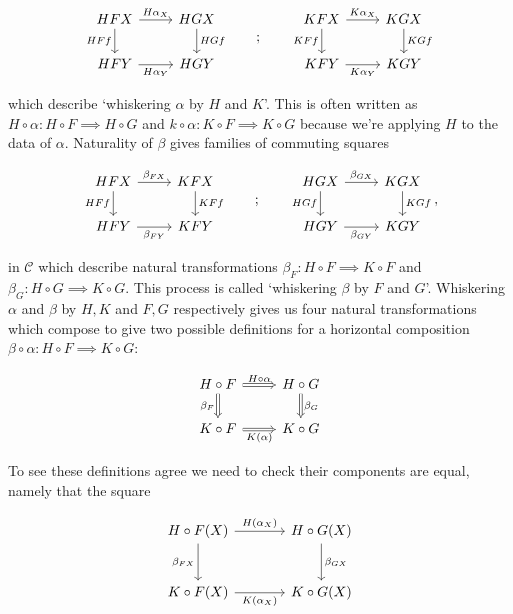 \documentclass[11pt]{amsart}
\theoremstyle{plain}
\theoremstyle{definition}
\newcommand{\cC}{{\mathcal C}}
\newcommand{\noi}{{\noindent}}
\begin{document}
\[ \begin{tikzcd}
  HFX \rar["H\alpha_X"] \dar["HFf"'] & HGX \dar["HGf"] \\
HFY \rar["H\alpha_Y"'] & HGY
\end{tikzcd}\qquad ; \qquad 
\begin{tikzcd}
  KFX \rar["K\alpha_X"] \dar["KFf"'] & KGX \dar["KGf"] \\
KFY \rar["K\alpha_Y"'] & KGY
\end{tikzcd}\]


\noi which describe `whiskering $\alpha$ by $H$ and $K$'. This is often written as $H \circ \alpha : H \circ F \implies H \circ G$ and $k \circ \alpha : K \circ F \implies K \circ G$ because we're applying $H$ to the data of $\alpha$. Naturality of $\beta$ gives families of commuting squares 

\[ \begin{tikzcd}
  HFX \rar["\beta_{FX}"] \dar["HFf"'] & KFX \dar["KFf"] \\
HFY \rar["\beta_{FY}"'] & KFY
\end{tikzcd}\qquad ; \qquad 
\begin{tikzcd}
  HGX \rar["\beta_{GX}"] \dar["HGf"'] & KGX \dar["KGf"] \\
HGY \rar["\beta_{GY}"'] & KGY
\end{tikzcd},\]

\noi in $\cC$ which describe natural transformations $\beta_F: H\circ F \implies K \circ F$ and $\beta_G: H \circ G \implies K \circ G$. This process is called `whiskering $\beta$ by $F$ and $G$'. Whiskering $\alpha$ and $\beta$ by $H,K$ and $F,G$ respectively gives us four natural transformations which compose to give two possible definitions for a horizontal composition $\beta \circ \alpha : H \circ F \implies K \circ G$:

\[ \begin{tikzcd}
  H \circ F 
  \rar[Rightarrow, "H\circ \alpha"]
   \dar[Rightarrow, "\beta_F"'] 
   & H \circ G \dar[Rightarrow, "\beta_G" ] \\
  K \circ F \rar[Rightarrow, "K(\alpha)"'] & K \circ G 
\end{tikzcd}\]

\noi To see these definitions agree we need to check their components are equal, namely that the square 

\[ \begin{tikzcd}[column sep = large, row sep = large]
  H\circ F (X) \dar["\beta_{FX}"']  \rar["H(\alpha_X)"] & H \circ G (X) \dar["\beta_{GX}"] \\
  K \circ F (X) \rar["K(\alpha_X)"'] & K \circ G (X)
\end{tikzcd}\]
\end{document}
